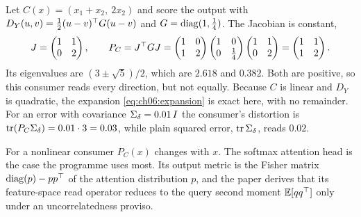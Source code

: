 \begin{example}\label{ex:ch06:linear}
Let $C(x)=(x_1+x_2,\ 2x_2)$ and score the output with $D_Y(u,v)=\tfrac12(u-v)^{\top} G(u-v)$ and $G=\operatorname{diag}(1,\tfrac14)$. The Jacobian is constant,
\[
J=\begin{pmatrix}1&1\\0&2\end{pmatrix},\qquad
P_C=J^{\top} G J=\begin{pmatrix}1&0\\1&2\end{pmatrix}\begin{pmatrix}1&0\\0&\tfrac14\end{pmatrix}\begin{pmatrix}1&1\\0&2\end{pmatrix}=\begin{pmatrix}1&1\\1&2\end{pmatrix}.
\]
Its eigenvalues are $(3\pm\sqrt5)/2$, which are $2.618$ and $0.382$. Both are positive, so this consumer reads every direction, but not equally. Because $C$ is linear and $D_Y$ is quadratic, the expansion \cref{eq:ch06:expansion} is exact here, with no remainder. For an error with covariance $\Sigma_\delta=0.01\,I$ the consumer's distortion is $\operatorname{tr}(P_C\Sigma_\delta)=0.01\cdot 3=0.03$, while plain squared error, $\operatorname{tr}\Sigma_\delta$, reads $0.02$.
\end{example}

For a nonlinear consumer $P_C(x)$ changes with $x$. The softmax attention head is the case the programme uses most. Its output metric is the Fisher matrix $\operatorname{diag}(p)-pp^{\top}$ of the attention distribution $p$, and the paper derives that its feature-space read operator reduces to the query second moment $\mathbb{E}[qq^{\top}]$ only under an uncorrelatedness proviso.



